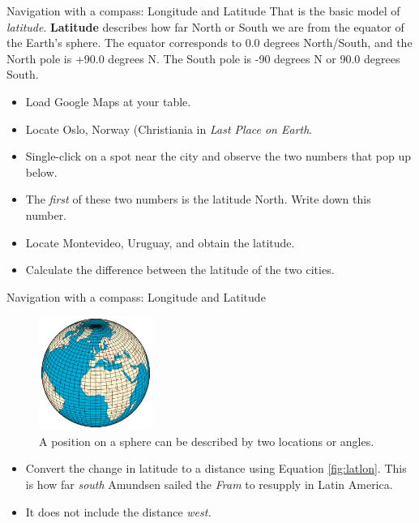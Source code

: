 \documentclass{beamer}
\begin{document}
\begin{frame}{Navigation with a compass: Longitude and Latitude}
\small
That is the basic model of \textit{latitude}.  \textbf{Latitude} describes how far North or South we are from the equator of the Earth's sphere.  The equator corresponds to 0.0 degrees North/South, and the North pole is +90.0 degrees N.  The South pole is -90 degrees N or 90.0 degrees South.
\begin{itemize}
\item Load Google Maps at your table.
\item Locate Oslo, Norway (Christiania in \textit{Last Place on Earth}.
\item Single-click on a spot near the city and observe the two numbers that pop up below.
\item The \textit{first} of these two numbers is the latitude North.  Write down this number.
\item Locate Montevideo, Uruguay, and obtain the latitude.
\item Calculate the difference between the latitude of the two cities.
\end{itemize}
\end{frame}

\begin{frame}{Navigation with a compass: Longitude and Latitude}
\begin{figure}
\centering
\includegraphics[width=0.33\textwidth]{latlon2.png}
\caption{\label{fig:latlon3} A position on a sphere can be described by two locations or angles.}
\end{figure}
\begin{itemize}
\item Convert the change in latitude to a distance using Equation \ref{fig:latlon}. This is how far \textit{south} Amundsen sailed the \textit{Fram} to resupply in Latin America.
\item It does not include the distance \textit{west.}
\end{itemize}
\end{frame}
\end{document}
